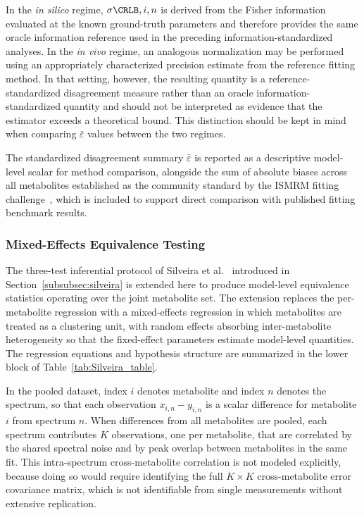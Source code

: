 In the \textit{in silico} regime, $\sigma{\CRLB,i,n}$ is derived from the Fisher information evaluated at the known ground-truth parameters and therefore provides the same oracle information reference used in the preceding information-standardized analyses. In the \textit{in vivo} regime, an analogous normalization may be performed using an appropriately characterized precision estimate from the reference fitting method. In that setting, however, the resulting quantity is a reference-standardized disagreement measure rather than an oracle information-standardized quantity and should not be interpreted as evidence that the \DL estimator exceeds a theoretical bound. This distinction should be kept in mind when comparing $\bar{\varepsilon}$ values between the two regimes.

The standardized disagreement summary $\bar{\varepsilon}$ is reported as a descriptive model-level scalar for method comparison, alongside the sum of absolute biases across all metabolites established as the community standard by the ISMRM fitting challenge~\cite{Marjanska2022}, which is included to support direct comparison with published fitting benchmark results.

\subsubsection{Mixed-Effects Equivalence Testing}
\label{subsubsec:mixed_effects_silveira}
The three-test inferential protocol of Silveira et al.~\cite{Silveira2024} introduced in Section~\ref{subsubsec:silveira} is extended here to produce model-level equivalence statistics operating over the joint metabolite set. The extension replaces the per-metabolite regression with a mixed-effects regression in which metabolites are treated as a clustering unit, with random effects absorbing inter-metabolite heterogeneity so that the fixed-effect parameters estimate model-level quantities. The regression equations and hypothesis structure are summarized in the lower block of Table~\ref{tab:Silveira_table}.

In the pooled dataset, index $i$ denotes metabolite and index $n$ denotes the spectrum, so that each observation $x_{i,n} - y_{i,n}$ is a scalar difference for metabolite $i$ from spectrum $n$. When differences from all metabolites are pooled, each spectrum contributes $K$ observations, one per metabolite, that are correlated by the shared spectral noise and by peak overlap between metabolites in the same fit. This intra-spectrum cross-metabolite correlation is not modeled explicitly, because doing so would require identifying the full $K \times K$ cross-metabolite error covariance matrix, which is not identifiable from single measurements without extensive replication. 

